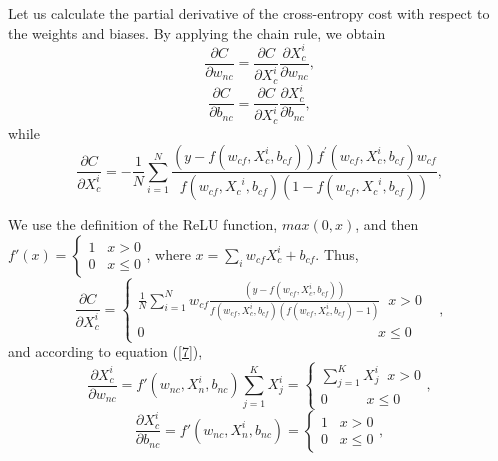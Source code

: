 \documentclass{sig-alternate-05-2015}
\begin{document}
Let us calculate the partial derivative of the cross-entropy cost with respect to the weights and biases. By applying the chain rule, we obtain
\begin{equation}\label{}
\frac{{\partial C}}{{\partial {w_{nc}}}} = \frac{{\partial C}}{{\partial {X_c^i}}}\frac{{\partial {X_c^i}}}{{\partial {w_{nc}}}},
\end{equation}
\begin{equation}\label{}
\frac{{\partial C}}{{\partial {b_{nc}}}} = \frac{{\partial C}}{{\partial X_c^i}}\frac{{\partial X_c^i}}{{\partial {b_{nc}}}},
\end{equation}
while
\begin{equation}\label{}
\frac{{\partial C}}{{\partial {X_c^i}}} =  - \frac{1}{N}\sum\limits_{i = 1}^N {\frac{{(y - f({w_{cf}},{X_c^i},{b_{cf}})){f^{'}}({w_{cf}},{X_c^i},{b_{cf}}){w_{cf}}}}{{f({w_{cf}},{X_c}^i,{b_{cf}})(1 - f({w_{cf}},{X_c}^i,{b_{cf}}))}}},
\end{equation}

We use the definition of the ReLU function, $max(0, x)$, and then $f'(x) = \left\{ \begin{array}{l}
1\;\;\;x > 0\\
0\;\;\;x \le 0
\end{array} \right.$, where $x = \sum\limits_i {{w_{cf}}X_c^i}  + {b_{cf}}$. Thus,
\begin{equation}\label{}
\frac{{\partial C}}{{\partial X_c^i}} = \left\{ \begin{array}{l}
\frac{1}{N}\sum\limits_{i = 1}^N {{w_{cf}}} \frac{{\left( {y - f({w_{cf}},X_c^i,{b_{cf}})} \right)}}{{f({w_{cf}},X_c^i,{b_{cf}})\left( {f({w_{cf}},X_c^i,{b_{cf}}) - 1} \right)}}\;\;x > 0\\
0\;\;\;\;\;\;\;\;\;\;\;\;\;\;\;\;\;\;\;\;\;\;\;\;\;\;\;\;\;\;\;\;\;\;\;\;\;\;\;\;\;\;\;\;\;\;\;\;\;\;\;\;\;\;\;\;\;\;\;\;x \le 0
\end{array} \right.\;\;\;,
\end{equation}
and according to equation (\ref{7}),
\begin{equation}\label{}
\frac{{\partial X_c^i}}{{\partial {w_{nc}}}} = f'({w_{nc}},X_n^i,{b_{nc}})\sum\limits_{j = 1}^K {X_j^i}  = \left\{ \begin{array}{l}
\sum\limits_{j = 1}^K {X_j^i} \;\;x > 0\\
0\;\;\;\;\;\;\;\;\;\;x \le 0
\end{array} \right.,
\end{equation}
\begin{equation}\label{}
\frac{{\partial X_c^i}}{{\partial {b_{nc}}}} = f'({w_{nc}},X_n^i,{b_{nc}}) = \left\{ \begin{array}{l}
1\;\;\;x > 0\\
0\;\;\;x \le 0
\end{array} \right.,
\end{equation}
\end{document}
